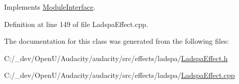Implements \hyperlink{class_module_interface_afdc247794e14d0349eba226a99937cc9}{Module\+Interface}.



Definition at line 149 of file Ladspa\+Effect.\+cpp.



The documentation for this class was generated from the following files\+:\begin{DoxyCompactItemize}
\item 
C\+:/\+\_\+dev/\+Open\+U/\+Audacity/audacity/src/effects/ladspa/\hyperlink{_ladspa_effect_8h}{Ladspa\+Effect.\+h}\item 
C\+:/\+\_\+dev/\+Open\+U/\+Audacity/audacity/src/effects/ladspa/\hyperlink{_ladspa_effect_8cpp}{Ladspa\+Effect.\+cpp}\end{DoxyCompactItemize}
